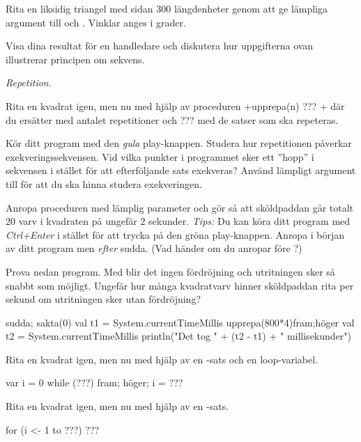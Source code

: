 \Subtask Rita en liksidig triangel med sidan 300 längdenheter genom att ge lämpliga argument till  och . Vinklar anges i grader.

\Subtask\Checkpoint Visa dina resultat för en handledare och diskutera hur uppgifterna ovan illustrerar principen om sekvens.

\Task \textit{Repetition}.

\Subtask Rita en kvadrat igen, men nu med hjälp av proceduren \code+upprepa(n){ ??? }+ där du ersätter  med antalet repetitioner och ??? med de satser som ska repeteras.

\Subtask Kör ditt program med den \emph{gula} play-knappen. Studera hur repetitionen påverkar exekveringssekvensen. Vid vilka punkter i programmet sker ett ''hopp'' i sekvensen i stället för att efterföljande sats exekveras? Använd lämpligt argument till  för att du ska hinna studera exekveringen.

\Subtask Anropa proceduren  med lämplig parameter och gör så att sköldpaddan går totalt 20 varv i kvadraten på ungefär 2 sekunder. \emph{Tips:} Du kan köra ditt program med \emph{Ctrl+Enter} i stället för att trycka på den gröna play-knappen. Anropa  i början av ditt program men \emph{efter} sudda. (Vad händer om du anropar  före ?)


\Subtask Prova nedan program. Med  blir det ingen fördröjning och utritningen sker så snabbt som möjligt. Ungefär hur många kvadratvarv hinner sköldpaddan rita per sekund om utritningen sker utan fördröjning? 
\begin{Code}
sudda; sakta(0)
val t1 = System.currentTimeMillis
upprepa(800*4){fram;höger}
val t2 = System.currentTimeMillis
println("Det tog " + (t2 - t1) + " millisekunder")
\end{Code}



\Subtask Rita en kvadrat igen, men nu med hjälp av en -sats och en loop-variabel.

\begin{Code}
var i = 0
while (???) {fram; höger; i = ???}
\end{Code}

\Subtask Rita en kvadrat igen, men nu med hjälp av en -sats.

\begin{Code}
for (i <- 1 to ???) {???}
\end{Code}

